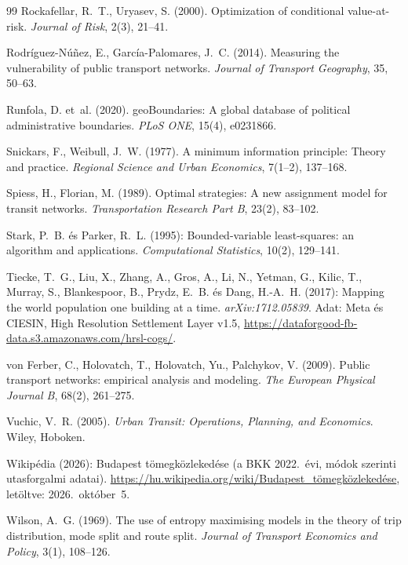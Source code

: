 \documentclass[12pt,a4paper]{article}
\theoremstyle{definition}
\theoremstyle{remark}
\begin{document}
\begin{thebibliography}{99}
Rockafellar, R.~T., Uryasev, S. (2000). Optimization of conditional
value-at-risk. \emph{Journal of Risk}, 2(3), 21--41.

Rodríguez-Núñez, E., García-Palomares, J.~C. (2014). Measuring the
vulnerability of public transport networks. \emph{Journal of Transport
Geography}, 35, 50--63.

Runfola, D. et~al. (2020). geoBoundaries: A global database of political
administrative boundaries. \emph{PLoS ONE}, 15(4), e0231866.

Snickars, F., Weibull, J.~W. (1977). A minimum information principle: Theory
and practice. \emph{Regional Science and Urban Economics}, 7(1--2),
137--168.

Spiess, H., Florian, M. (1989). Optimal strategies: A new assignment model for
transit networks. \emph{Transportation Research Part B}, 23(2), 83--102.

Stark, P.~B. és Parker, R.~L. (1995): Bounded-variable least-squares: an
algorithm and applications. \emph{Computational Statistics}, 10(2), 129--141.

Tiecke, T.~G., Liu, X., Zhang, A., Gros, A., Li, N., Yetman, G., Kilic, T.,
Murray, S., Blankespoor, B., Prydz, E.~B. és Dang, H.-A.~H. (2017): Mapping
the world population one building at a time. \emph{arXiv:1712.05839}.
Adat: Meta és CIESIN, High Resolution Settlement Layer v1.5,
\url{https://dataforgood-fb-data.s3.amazonaws.com/hrsl-cogs/}.

von Ferber, C., Holovatch, T., Holovatch, Yu., Palchykov, V. (2009). Public
transport networks: empirical analysis and modeling. \emph{The European
Physical Journal B}, 68(2), 261--275.

Vuchic, V.~R. (2005). \emph{Urban Transit: Operations, Planning, and
Economics}. Wiley, Hoboken.

Wikipédia (2026): Budapest tömegközlekedése (a BKK 2022.~évi, módok szerinti
utasforgalmi adatai). \url{https://hu.wikipedia.org/wiki/Budapest_tömegközlekedése},
letöltve: 2026.~október~5.

Wilson, A.~G. (1969). The use of entropy maximising models in the theory of
trip distribution, mode split and route split. \emph{Journal of Transport
Economics and Policy}, 3(1), 108--126.


\end{thebibliography}
\end{document}
